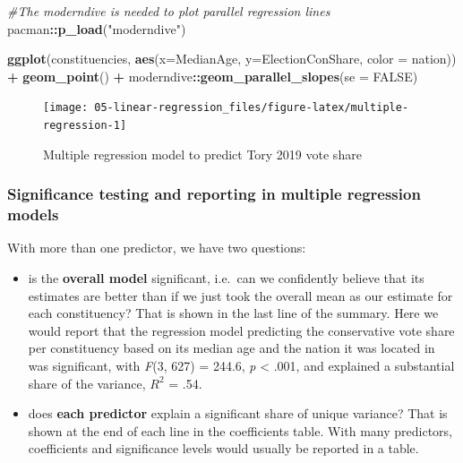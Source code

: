 \documentclass[
]{book}
\newenvironment{Shaded}{\begin{snugshade}}{\end{snugshade}}
\newcommand{\CommentTok}[1]{\textcolor[rgb]{0.56,0.35,0.01}{\textit{#1}}}
\newcommand{\DataTypeTok}[1]{\textcolor[rgb]{0.13,0.29,0.53}{#1}}
\newcommand{\KeywordTok}[1]{\textcolor[rgb]{0.13,0.29,0.53}{\textbf{#1}}}
\newcommand{\NormalTok}[1]{#1}
\newcommand{\OperatorTok}[1]{\textcolor[rgb]{0.81,0.36,0.00}{\textbf{#1}}}
\newcommand{\OtherTok}[1]{\textcolor[rgb]{0.56,0.35,0.01}{#1}}
\newcommand{\StringTok}[1]{\textcolor[rgb]{0.31,0.60,0.02}{#1}}
\providecommand{\tightlist}{%
  \setlength{\itemsep}{0pt}\setlength{\parskip}{0pt}}
\begin{document}
\begin{Shaded}
\begin{Highlighting}[]
\CommentTok{#The moderndive is needed to plot parallel regression lines}
\NormalTok{pacman}\OperatorTok{::}\KeywordTok{p_load}\NormalTok{(}\StringTok{"moderndive"}\NormalTok{)}

\KeywordTok{ggplot}\NormalTok{(constituencies, }\KeywordTok{aes}\NormalTok{(}\DataTypeTok{x=}\NormalTok{MedianAge, }\DataTypeTok{y=}\NormalTok{ElectionConShare, }\DataTypeTok{color =}\NormalTok{ nation)) }\OperatorTok{+}\StringTok{ }\KeywordTok{geom_point}\NormalTok{() }\OperatorTok{+}\StringTok{ }\NormalTok{moderndive}\OperatorTok{::}\KeywordTok{geom_parallel_slopes}\NormalTok{(}\DataTypeTok{se =} \OtherTok{FALSE}\NormalTok{)}
\end{Highlighting}
\end{Shaded}

\begin{figure}

{\centering \texttt{[image: 05-linear-regression\_files/figure-latex/multiple-regression-1]} 

}

\caption{Multiple regression model to predict Tory 2019 vote share}\label{fig:multiple-regression}
\end{figure}

\hypertarget{significance-testing-and-reporting-in-multiple-regression-models}{%
\subsubsection{Significance testing and reporting in multiple regression models}\label{significance-testing-and-reporting-in-multiple-regression-models}}

With more than one predictor, we have two questions:

\begin{itemize}
\tightlist
\item
  is the \textbf{overall model} significant, i.e.~can we confidently
  believe that its estimates are better than if we just took the
  overall mean as our estimate for each constituency? That is shown in
  the last line of the summary. Here we would report that the
  regression model predicting the conservative vote share per
  constituency based on its median age and the nation it was located
  in was significant, with \emph{F}(3, 627) = 244.6, \emph{p} \textless{} .001, and
  explained a substantial share of the variance, \(R^2\) = .54.
\item
  does \textbf{each predictor} explain a significant share of unique
  variance? That is shown at the end of each line in the coefficients
  table. With many predictors, coefficients and significance levels
  would usually be reported in a table.
\end{itemize}
\end{document}
